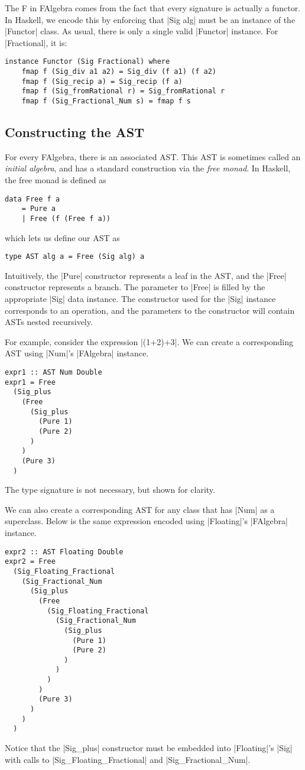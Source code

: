 \documentclass[preprint]{sigplanconf}
\theoremstyle{definition}
\begin{document}
The F in FAlgebra comes from the fact that every signature is actually a functor.
In Haskell, we encode this by enforcing that |Sig alg| must be an instance of the |Functor| class.
As usual, there is only a single valid |Functor| instance.
For |Fractional|, it is:
\begin{lstlisting}
instance Functor (Sig Fractional) where
    fmap f (Sig_div a1 a2) = Sig_div (f a1) (f a2)
    fmap f (Sig_recip a) = Sig_recip (f a)
    fmap f (Sig_fromRational r) = Sig_fromRational r
    fmap f (Sig_Fractional_Num s) = fmap f s
\end{lstlisting}

\subsection{Constructing the AST}

For every FAlgebra, there is an associated AST.
This AST is sometimes called an \emph{initial algebra},
and has a standard construction via the \emph{free monad}.
In Haskell, the free monad is defined as
\begin{lstlisting}
data Free f a
    = Pure a
    | Free (f (Free f a))
\end{lstlisting}
which lets us define our AST as
\begin{lstlisting}
type AST alg a = Free (Sig alg) a
\end{lstlisting}
Intuitively,
the |Pure| constructor represents a leaf in the AST,
and the |Free| constructor represents a branch.
The parameter to |Free| is filled by the appropriate |Sig| data instance.
The constructor used for the |Sig| instance corresponds to an operation,
and the parameters to the constructor will contain ASTs nested recursively.

For example, consider the expression |(1+2)+3|.
We can create a corresponding AST using |Num|'s |FAlgebra| instance.
\begin{lstlisting}
expr1 :: AST Num Double
expr1 = Free
  (Sig_plus
    (Free
      (Sig_plus
        (Pure 1)
        (Pure 2)
      )
    )
    (Pure 3)
  )
\end{lstlisting}
The type signature is not necessary, but shown for clarity.

We can also create a corresponding AST for any class that has |Num| as a superclass.
Below is the same expression encoded using |Floating|'s |FAlgebra| instance.
\begin{lstlisting}
expr2 :: AST Floating Double
expr2 = Free
  (Sig_Floating_Fractional
    (Sig_Fractional_Num
      (Sig_plus
        (Free
          (Sig_Floating_Fractional
            (Sig_Fractional_Num
              (Sig_plus
                (Pure 1)
                (Pure 2)
              )
            )
          )
        )
        (Pure 3)
      )
    )
  )
\end{lstlisting}
Notice that the |Sig_plus| constructor must be embedded into |Floating|'s |Sig| with calls to |Sig_Floating_Fractional| and |Sig_Fractional_Num|.
\end{document}
